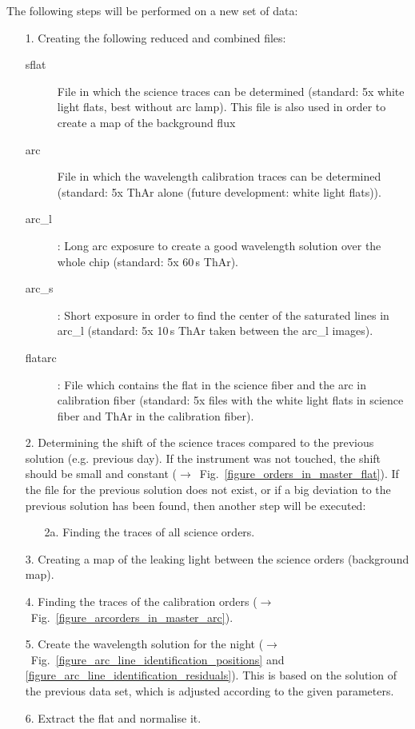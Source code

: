\documentclass[10pt,a4paper]{article}
\begin{document}
\noindent The following steps will be performed on a new set of data:
\begin{itemize}
  \item[1.] Creating the following reduced and combined files:
  \begin{description}
    \item[sflat] File in which the science traces can be determined (standard: 5x white light flats, best without arc lamp). This file is also used in order to create a map of the background flux
    \item[arc] File in which the wavelength calibration traces can be determined (standard: 5x ThAr alone (future development: white light flats)).
    \item[arc\_l]: Long arc exposure to create a good wavelength solution over the whole chip (standard: 5x 60\,s ThAr).
    \item[arc\_s]: Short exposure in order to find the center of the saturated lines in arc\_l (standard: 5x 10\,s ThAr taken between the arc\_l images).
    \item[flatarc]: File which contains the flat in the science fiber and the arc in calibration fiber (standard: 5x files with the white light flats in science fiber and ThAr in the calibration fiber).
  \end{description}
  \item[2.] Determining the shift of the science traces compared to the previous solution (e.g. previous day). If the instrument was not touched, the shift should be small and constant ($\rightarrow$~Fig.~\ref{figure_orders_in_master_flat}). If the file for the previous solution does not exist, or if a big deviation to the previous solution has been found, then another step will be executed:
  \begin{itemize}
    \item[2a.] Finding the traces of all science orders.
  \end{itemize}
  \item[3.] Creating a map of the leaking light between the science orders (background map).
  \item[4.] Finding the traces of the calibration orders ($\rightarrow$~Fig.~\ref{figure_arcorders_in_master_arc}).
  \item[5.] Create the wavelength solution for the night ($\rightarrow$~Fig.~\ref{figure_arc_line_identification_positions} and \ref{figure_arc_line_identification_residuals}). This is based on the solution of the previous data set, which is adjusted according to the given parameters.
  \item[6.] Extract the flat and normalise it.
\end{itemize}
\end{document}

